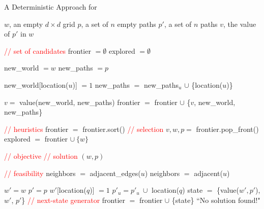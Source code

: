 \documentclass[../main.tex]{subfiles}
\begin{document}
\begin{algorithm}
\caption{A Deterministic Approach for \prob}
\label{fig:det-pseudocode}
    \begin{algorithmic}[1]
        \REQUIRE $w$, an empty $d\times d$ grid
        \REQUIRE $p$, a set of $n$ empty paths
        \ENSURE $p'$, a set of $n$ paths
        \ENSURE $v$, the value of $p'$ in $w$

        \STATE \textcolor{red}{// set of candidates}
        \STATE frontier $=\emptyset$
        \STATE explored $=\emptyset$

            \STATE new\_world $=w$
            \STATE new\_paths $=p$

                \STATE new\_world[location($u$)] $=1$
                \STATE new\_paths $=$ new\_paths$_u$ $\cup$ \{location($u$)\}
            \ENDFOR

            \STATE $v=$ value(new\_world, new\_paths)
            \STATE frontier $=$ frontier $\cup$ \{$v$, new\_world, new\_paths\}
        \ENDFOR

            \STATE \textcolor{red}{// heuristics}
            \STATE frontier $=$ frontier.sort() 
            \STATE \textcolor{red}{// selection}
            \STATE $v,w,p=$ frontier.pop\_front()
            \STATE explored $=$ frontier $\cup\ \{w\}$

            \STATE \textcolor{red}{// objective}
                \STATE \textcolor{red}{// solution}
                \RETURN $(w,p)$
            \ENDIF

            \STATE \textcolor{red}{// feasibility}
                    \STATE neighbors $=$ adjacent\_edges($u$)
                \ELSE
                    \STATE neighbors $=$ adjacent($u$)
                \ENDIF

                    \STATE $w'=w$
                    \STATE $p'=p$
                    \STATE $w'$[location($q$)] $=1$
                    \STATE $p'_u=p'_u\ \cup$ location($q$)
                    \STATE state $=$ \{value($w',p'$), $w'$, $p'$\}
                        \STATE \textcolor{red}{// next-state generator}
                        \STATE frontier $=$ frontier $\cup$ \{state\}
                    \ENDIF
                \ENDFOR
            \ENDFOR
        \ENDWHILE
        \RETURN ``No solution found!"
    \end{algorithmic}
\end{algorithm}
\end{document}
